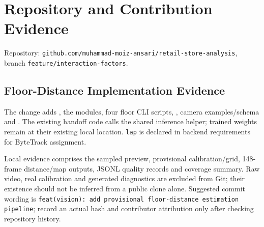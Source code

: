 \chapter{Repository and Contribution Evidence}
\label{app:repo}
Repository: \texttt{github.com/muhammad-moiz-ansari/retail-store-analysis}, branch \texttt{feature/interaction-factors}.


\section{Floor-Distance Implementation Evidence}
The change adds , the  modules, four floor CLI scripts, , camera examples/schema and . The existing handoff code calls the shared inference helper; trained weights remain at their existing local location. \texttt{lap} is declared in backend requirements for ByteTrack assignment.

Local evidence comprises the sampled preview, provisional calibration/grid, 148-frame distance/map outputs, JSONL quality records and coverage summary. Raw video, real calibration and generated diagnostics are excluded from Git; their existence should not be inferred from a public clone alone. Suggested commit wording is \texttt{feat(vision): add provisional floor-distance estimation pipeline}; record an actual hash and contributor attribution only after checking repository history.
